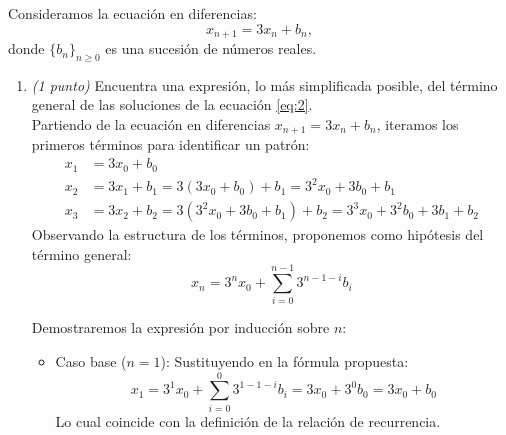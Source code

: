 \documentclass[12pt]{article}
\begin{document}
    \begin{ejercicio}
        Consideramos la ecuación en diferencias:
        \begin{equation}\label{eq:2}
        x_{n+1} = 3x_n + b_n,
        \end{equation}
        donde $\{b_n\}_{n \ge 0}$ es una sucesión de números reales.
    
        \begin{enumerate}
            \item \label{item:1}
            \emph{(1 punto)} Encuentra una expresión, lo más simplificada posible, del término general de las soluciones de la ecuación \eqref{eq:2}. \\
            Partiendo de la ecuación en diferencias $x_{n+1} = 3x_n + b_n$, iteramos los primeros términos para identificar un patrón:
            \begin{align*}
                x_1 &= 3x_0 + b_0 \\
                x_2 &= 3x_1 + b_1 = 3(3x_0 + b_0) + b_1 = 3^2x_0 + 3b_0 + b_1 \\
                x_3 &= 3x_2 + b_2 = 3(3^2x_0 + 3b_0 + b_1) + b_2 = 3^3x_0 + 3^2b_0 + 3b_1 + b_2 
            \end{align*}
            Observando la estructura de los términos, proponemos como hipótesis del término general:
            $$x_n = 3^n x_0 + \sum_{i=0}^{n-1} 3^{n-1-i} b_i$$ 
            
            Demostraremos la expresión por inducción sobre $n$:
            \begin{itemize}
                \item Caso base ($n=1$):
                Sustituyendo en la fórmula propuesta:
                $$x_1 = 3^1 x_0 + \sum_{i=0}^{0} 3^{1-1-i} b_i = 3x_0 + 3^0 b_0 = 3x_0 + b_0$$
                Lo cual coincide con la definición de la relación de recurrencia.
                

\end{itemize}
\end{enumerate}
\end{ejercicio}
\end{document}
